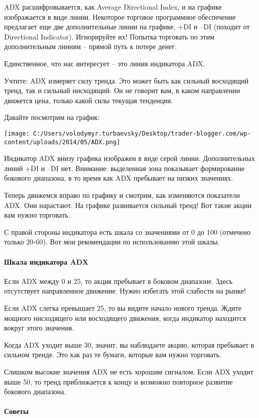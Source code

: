 \documentclass[a5paper]{article}
\begin{document}
ADX расшифровывается, как Average Directional Index, и на графике изображается в виде линии. Некоторое торговое программное обеспечение предлагает еще две дополнительные линии на графике, +DI и –DI (походит от Directional Indicator). Игнорируйте их! Попытка торговать по этим дополнительным линиям – прямой путь к потере денег.

Единственное, что нас интересует – это линия индикатора ADX.

Учтите: ADX измеряет силу тренда. Это может быть как сильный восходящий тренд, так и сильный нисходящий. Он не говорит вам, в каком направлении движется цена, только какой силы текущая тенденция.

Давайте посмотрим на график:

\texttt{[image: C:/Users/volodymyr.turbaevsky/Desktop/trader-blogger.com/wp-content/uploads/2014/05/ADX.png]}

Индикатор ADX внизу графика изображен в виде серой линии. Дополнительных линий +DI и –DI нет. Внимание: выделенная зона показывает формирование бокового диапазона, в то время как ADX пребывает на низких значениях.

Теперь движемся вправо по графику и смотрим, как изменяются показатели ADX. Они нарастают. На графике развивается сильный тренд! Вот такие акции вам нужно торговать.

С правой стороны индикатора есть шкала со значениями от 0 до 100
(отмечено только 20-60). Вот мои рекомендации по использованию этой
шкалы.

\paragraph{Шкала индикатора ADX}

Если ADX между 0 и 25, то акция пребывает в боковом диапазоне. Здесь отсутствует направленное движение. Нужно избегать этой слабости на рынке!

Если ADX слегка превышает 25, то вы видите начало нового тренда. Ждите мощного нисходящего или восходящего движения, когда индикатор находится вокруг этого значения.

Когда ADX уходит выше 30, значит, вы наблюдаете акцию, которая пребывает в сильном тренде. Это как раз те бумаги, которые вам нужно торговать.

Слишком высокие значения ADX не есть хорошим сигналом. Если ADX уходит
выше 50, то тренд приближается к концу и возможно повторное развитие
бокового диапазона.

\paragraph{Советы}
\end{document}
